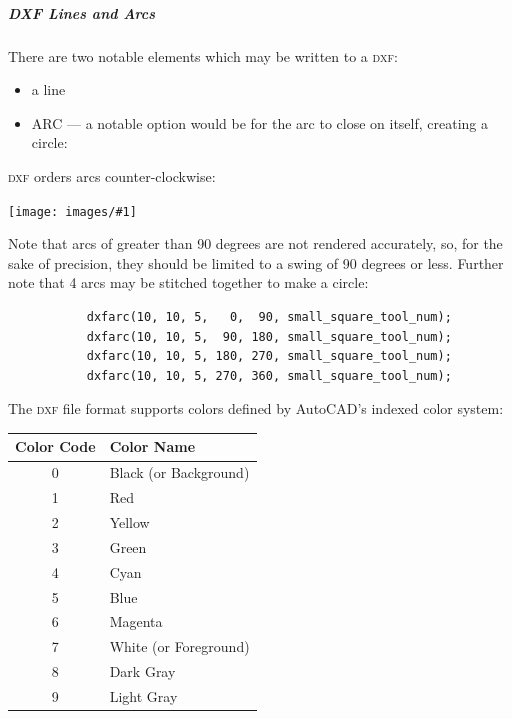 \documentclass{ltxdoc}
\newcommand{\includeimage}[1]{\bigskip\noindent\texttt{[image: images/\#1]}\bigskip}
\begin{document}
\subparagraph*{DXF Lines and Arcs}%
 
There are two notable elements which may be written to a \textsc{dxf}:

\begin{itemize}
 \item a line %
 \item ARC --- a notable option would be for the arc to close on itself, creating a circle:
\end{itemize}
 
\textsc{dxf} orders arcs counter-clockwise:

\includeimage{arcs_circle_degrees.pdf}%

Note that arcs of greater than 90 degrees are not rendered accurately, so, for the sake of precision, they should be limited to a swing of 90 degrees or less. Further note that 4 arcs may be stitched together to make a circle:
 
\begin{verbatim}
           dxfarc(10, 10, 5,   0,  90, small_square_tool_num);
           dxfarc(10, 10, 5,  90, 180, small_square_tool_num);
           dxfarc(10, 10, 5, 180, 270, small_square_tool_num);
           dxfarc(10, 10, 5, 270, 360, small_square_tool_num);
\end{verbatim}
 
%
%

The \textsc{dxf} file format supports colors defined by AutoCAD's indexed color system:

\begin{center}
\noindent\begin{tabular}{cl}
Color Code & Color Name \\
\toprule
	 0 & Black (or Background)  \\
	 1 & Red \\
	 2 & Yellow \\
	 3 & Green  \\
	 4 & Cyan  \\
	 5 & Blue \\
	 6 & Magenta \\ 
	 7 & White (or Foreground)\\
	 8 & Dark Gray \\ 
	 9 & Light Gray \\\bottomrule
\end{tabular}
\end{center}
\end{document}
